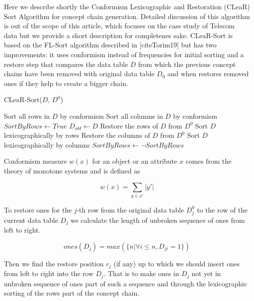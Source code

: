 \documentclass[acmconf,authordraft]{acmart}
\begin{document}
Here we describe shortly the Conformism Lexicographic and Restoration (CLeaR) Sort Algorithm for concept chain generation. Detailed discussion of this algorithm is out of the scope of this article, which focuses on the case study of Telecom data but we provide a short description for completenes sake. CLeaR-Sort is based on the FL-Sort algorithm described in [citeTorim19] but has two improvements: it uses conformism instead of frequencies for initial sorting and a restore step that compares the data table $D$ from which the previous concept chains have been removed with original data table $D_0$ and when restores removed ones if they help to create a bigger chain. 


\begin{algorithm}
\caption{CLeaR-Sort($D$, $D^0$)}
\label{CLeaR-Sort}
\begin{algorithmic}
\State Sort all rows in $D$ by conformism
\State Sort all columns in $D$ by conformism
\State $SortByRows \gets True$
    \State $D_{old} \gets D$
        \State Restore the rows of $D$ from $D^0$ 
        \State Sort $D$ lexicographically by rows
    \Else
        \State Restore the columns of $D$ from $D^0$
        \State Sort $D$ lexicographically by columns
    \EndIf
    \State $SortByRows \gets \neg SortByRows$
\EndWhile
\end{algorithmic}
\end{algorithm}

Conformism measure $w(x)$ for an object or an attribute $x$ comes from the theory of monotone systems \cite{vohandu_algorithms_2006} and is defined as

\begin{equation}
w(x) = \sum_{y \in x'}|y'|
\label{ms_weight}
\end{equation}

To restore ones for the $j$-th row from the original data table $D^0_j$ to the row of the current data table $D_j$ we calculate the length of unbroken sequence of ones from left to right.

\begin{equation}
ones(D_j) = max(\{n | \forall i \leq n, D_{ji}=1\})
\label{ones}
\end{equation}

Then we find the restore position $r_j$ (if any) up to which we should insert ones from left to right into the row $D_j$. That is to make ones in $D_j$ not yet in unbroken sequence of ones part of such a sequence and through the lexicographic sorting of the rows part of the concept chain.
\end{document}
